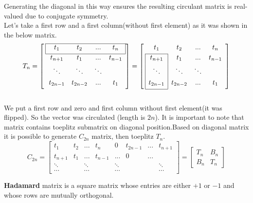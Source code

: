	Generating the diagonal in this way ensures the resulting circulant matrix is real-valued due to conjugate symmetry.
	\\
	Let's take a first row and a first column(without first element) as it was shown in the below matrix.
	$$
	T_{n} = \left[ \: 
	\begin{array}{*{4}{c}}
	\cline{1-4}
	\multicolumn{1}{|c}{t_{1}} & t_{2} & ...& \multicolumn{1}{c|}{t_{n}}           \\[0.3em]
	\cline{1-4}
	t_{n+1} & t_{1} & ... & t_{n-1} \\[0.3em]
	\ddots &\ddots & \ddots &    \\[0.3em]
	t_{2n-1} & t_{2n-2} & ... & t_{1}      \\[0.3em]    
	\end{array}
	\right]
	=
	\left[ \:
	\begin{array}{*{4}{c}}
	t_{1} & t_{2} & ...& t_{n}        \\[0.3em]
	\cline{1-1}
	\multicolumn{1}{|c|}{t_{n+1}} & t_{1} & ... & t_{n-1} \\[0.3em]
	\multicolumn{1}{|c|}{\ddots} & \ddots & \ddots &    \\[0.3em]
	\multicolumn{1}{|c|}{t_{2n-1}} & t_{2n-2} & ... & t_{1}          \\[0.3em]
	\cline{1-1}
	\end{array}
	\right]
	$$
	\\
	 We put a first row and zero and first column without first element(it was flipped). So the vector was circulated (length is $2n$). It is important to note that matrix contains toeplitz submatrix on diagonal position.Based on diagonal matrix  it is possible to generate $C_{2n}$ matrix, then toeplitz $T_{n}$.
	\\
	$$
	C_{2n} =\begin{bmatrix}
	t_{1}   & t_{2} & ...    & t_{n}  & 0   & t_{2n-1} & ... &  t_{n+1}   \\[0.3em]
	t_{n+1} & t_{1} & ...    & t_{n-1}& ... & 0  & ... &          \\[0.3em]
	\ddots  &       & \ddots &        & \ddots & & &\ddots    \\[0.3em]
	\cdots  &       & \cdots &       & \cdots & & & \cdots
	\end{bmatrix}
	=
	\begin{bmatrix}
	T_{n} & B_{n}            \\[0.3em]
	B_{n} & T_{n}   
	\end{bmatrix}
	$$

	\textbf{Hadamard} matrix is a square matrix whose entries are either $+1$ or $-1$ and whose rows are mutually orthogonal.


